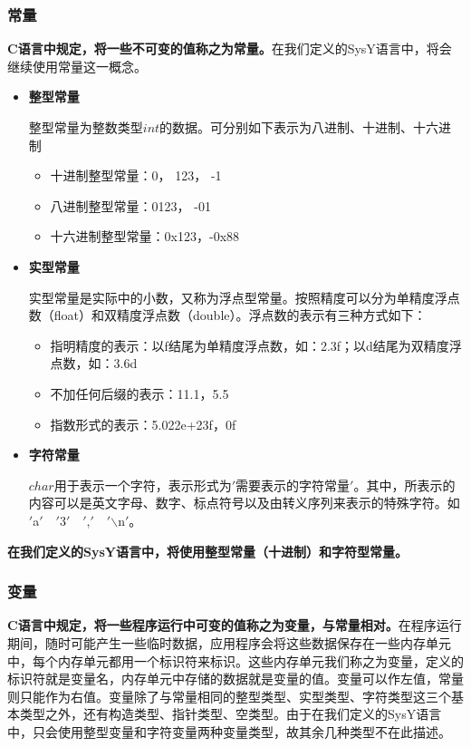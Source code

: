 \documentclass[UTF8,a4paper,10pt]{ctexart}
\begin{document}
\subsubsection{常量}
\textbf{C语言中规定，将一些不可变的值称之为常量。}在我们定义的SysY语言中，将会继续使用常量这一概念。
\\
\begin{itemize}
  \item \textbf{整型常量}
  \par 整型常量为整数类型$int$的数据。可分别如下表示为八进制、十进制、十六进制
    \begin{itemize}
    \item 十进制整型常量：0， 123， -1
    \item 八进制整型常量：0123， -01
    \item 十六进制整型常量：0x123，-0x88
    \end{itemize}
  \item \textbf{实型常量}
  \par 实型常量是实际中的小数，又称为浮点型常量。按照精度可以分为单精度浮点数（float）和双精度浮点数（double）。浮点数的表示有三种方式如下：
    \begin{itemize}
    \item 指明精度的表示：以f结尾为单精度浮点数，如：2.3f；以d结尾为双精度浮点数，如：3.6d
    \item 不加任何后缀的表示：11.1，5.5
    \item 指数形式的表示：5.022e+23f，0f
    \end{itemize}
  \item \textbf{字符常量}
  \par $char$用于表示一个字符，表示形式为$'$需要表示的字符常量$'$。其中，所表示的内容可以是英文字母、数字、标点符号以及由转义序列来表示的特殊字符。如$'$a$'$\ \  $'$3$'$\ \  $'$,$'$\ \  $'$$\backslash$n$'$。
\end{itemize}
\textbf{在我们定义的SysY语言中，将使用整型常量（十进制）和字符型常量。}
\subsubsection{变量}
\textbf{C语言中规定，将一些程序运行中可变的值称之为变量，与常量相对。}在程序运行期间，随时可能产生一些临时数据，应用程序会将这些数据保存在一些内存单元中，每个内存单元都用一个标识符来标识。这些内存单元我们称之为变量，定义的标识符就是变量名，内存单元中存储的数据就是变量的值。\cite{bl}变量可以作左值，常量则只能作为右值。变量除了与常量相同的整型类型、实型类型、字符类型这三个基本类型之外，还有构造类型、指针类型、空类型。由于在我们定义的SysY语言中，只会使用整型变量和字符变量两种变量类型，故其余几种类型不在此描述。
\end{document}
